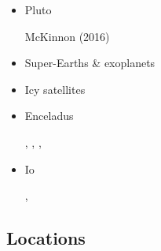 \begin{itemize}
\item Pluto 

   \begin{scriptsize}
   McKinnon \etal (2016) \cite{mcnw16}
   \end{scriptsize}

\item Super-Earths \& exoplanets 
   \begin{scriptsize}
   \cite{stfl11}\cite{vata11}
   \cite{stlh13}
   \cite{welo15}\cite{miko15}\cite{kamo15}
   \end{scriptsize}

\item Icy satellites  
   \begin{scriptsize}
   \cite{kasc12b}
   \end{scriptsize}

\item Enceladus  
   \begin{scriptsize}
   \cite{roni08},
   \cite{betc10},
   \cite{hats12},
   \cite{robg14}
   \end{scriptsize}

\item Io  
   \begin{scriptsize}
   \cite{tasg01}, \cite{tack01}
   \end{scriptsize}
\end{itemize}

\subsection{Locations}

